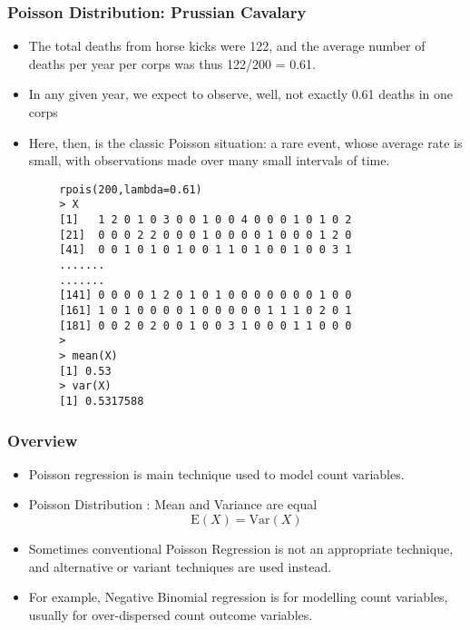 \documentclass[MASTER.tex]{subfiles}
\begin{document}
\begin{frame}
	\frametitle{Poisson Distribution: Prussian Cavalary}
	\Large
	\begin{itemize}
\item The total deaths from horse kicks were 122, and the average number of deaths per year per corps was thus 122/200 = 0.61. 
\item In any given year, we expect to observe, well, not exactly 0.61 deaths in one corps 
\item Here, then, is the classic Poisson situation: a rare event, whose average rate is small, with observations made over many small intervals of time.
\end{itemize}
\end{frame}

\begin{frame}[fragile]
	\begin{framed}
		\begin{verbatim}
		rpois(200,lambda=0.61)
		> X
		[1]   1 2 0 1 0 3 0 0 1 0 0 4 0 0 0 1 0 1 0 2
		[21]  0 0 0 2 2 0 0 0 1 0 0 0 0 1 0 0 0 1 2 0
		[41]  0 0 1 0 1 0 1 0 0 1 1 0 1 0 0 1 0 0 3 1
		.......
		.......
		[141] 0 0 0 0 1 2 0 1 0 1 0 0 0 0 0 0 0 1 0 0
		[161] 1 0 1 0 0 0 0 1 0 0 0 0 0 1 1 1 0 2 0 1
		[181] 0 0 2 0 2 0 0 1 0 0 3 1 0 0 0 1 1 0 0 0
		>
		> mean(X)
		[1] 0.53
		> var(X)
		[1] 0.5317588
		\end{verbatim}
	\end{framed}
\end{frame}
\begin{frame}
\frametitle{Overview}
\Large
\begin{itemize}
\item  Poisson regression is main technique used to model count variables.

\item Poisson Distribution : Mean and Variance are equal
\[ \mathrm{E}(X)  = \mathrm{Var}(X) \]


\item  Sometimes conventional Poisson Regression is not an appropriate technique, and alternative or variant techniques are used instead.


\item  For example, Negative Binomial regression is for modelling count variables, usually for over-dispersed count outcome variables.
\end{itemize}
\end{frame}
\end{document}

